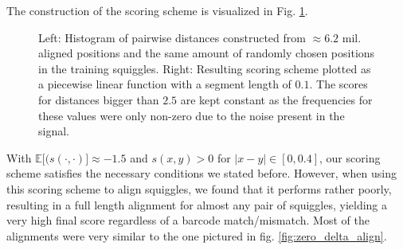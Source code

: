 The construction of the scoring scheme is visualized in Fig. \ref{fig:scoring_scheme}.

\begin{figure}[!ht]
    \centering
    \qquad
    \caption[Scoring scheme construction.]{Left: Histogram of pairwise distances constructed from $\approx 6.2$ mil. aligned positions and the same amount of randomly chosen positions in the training squiggles. Right: Resulting scoring scheme plotted as a piecewise linear function with a segment length of $0.1$. The scores for distances bigger than $2.5$ are kept constant as the frequencies for these values were only non-zero due to the noise present in the signal.}%
    \label{fig:scoring_scheme}%
\end{figure}

With $\mathbb{E}\big[(s(\cdot, \cdot)\big] \approx -1.5$ and $s(x, y) > 0$ for $|x-y| \in [0, 0.4]$, our scoring scheme satisfies the necessary conditions we stated before.  However, when using this scoring scheme to align squiggles, we found that it performs rather poorly, resulting in a full length alignment for almost any pair of squiggles, yielding a very high final score regardless of a barcode match/mismatch. Most of the alignments were very similar to the one pictured in fig. \ref{fig:zero_delta_align}.

